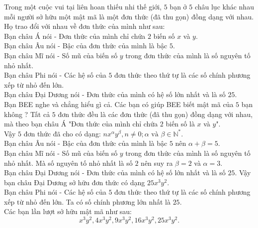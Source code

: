 \begin{vd}%
	Trong một cuộc vui tại liên hoan thiếu nhi thế giới, $ 5 $ bạn ở $ 5 $ châu lục khác nhau mỗi người sở hữu một mật mã là một đơn thức (đã thu gọn) đồng dạng với nhau. Họ trao đổi với nhau về đơn thức của mình như sau:\\
	Bạn châu Á nói - Đơn thức của mình chỉ chứa $ 2 $ biến số $ x $ và $ y $.\\
	Bạn châu Âu nói - Bậc của đơn thức của mình là bậc $ 5 $.\\
	Bạn châu Mĩ nói - Số mũ của biến số $ y $ trong đơn thức của mình là số nguyên tố nhỏ nhất.\\
	Bạn châu Phi nói - Các hệ số của $ 5 $ đơn thức theo thứ tự là các số chính phương xếp từ nhỏ đến lớn.\\
	Bạn châu Đại Dương nói - Đơn thức của mình có hệ số lớn nhất và là số $ 25 $.\\
	Bạn BEE nghe và chẳng hiểu gì cả. Các bạn có giúp BEE biết mật mã của $ 5 $ bạn không ?
	\loigiai
	{
		Tất cả $ 5 $ đơn thức đều là các đơn thức (đã thu gọn) đồng dạng với nhau, mà theo bạn châu Á "Đơn thức của mình chỉ chứa $ 2 $ biến số là $ x $ và $ y $".\\
		Vậy $ 5 $ đơn thức đã cho có dạng: $ nx^\alpha y^\beta , n \ne 0; \alpha \text{ và } \beta \in \mathbb{N^*}$.\\
		Bạn châu Âu nói - Bậc của đơn thức của mình là bậc $ 5 $ nên $ \alpha +\beta =5 $.\\ 
		Bạn châu Mĩ nói - Số mũ của biến số $ y $ trong đơn thức của mình là số nguyên tố nhỏ nhất. Mà số nguyên tố nhỏ nhất là số $ 2 $ nên suy ra $ \beta =2 $ và $ \alpha =3 $.\\
		Bạn châu Đại Dương nói - Đơn thức của mình có hệ số lớn nhất và là số $ 25 $. Vậy bạn châu Đại Dương sở hữu đơn thức có dạng $ 25x^3y^2 $.\\
		Bạn châu Phi nói - Các hệ số của $ 5 $ đơn thức theo thứ tự là các số chính phương xếp từ nhỏ đến lớn. Ta có số chính phương lớn nhất là $ 25 $.\\
		Các bạn lần lượt sở hữu mật mã như sau:
		\[ x^3y^2, 4x^3y^2, 9x^3y^2, 16x^3y^2, 25x^3y^2.\]
	}
\end{vd}

